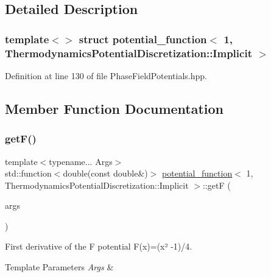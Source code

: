 \subsection{Detailed Description}
\subsubsection*{template$<$$>$\newline
struct potential\+\_\+function$<$ 1, Thermodynamics\+Potential\+Discretization\+::\+Implicit $>$}



Definition at line 130 of file Phase\+Field\+Potentials.\+hpp.



\subsection{Member Function Documentation}
\mbox{\label{structpotential__function_3_011_00_01ThermodynamicsPotentialDiscretization_1_1Implicit_01_4_af57f36f2f98b7c524a03273504fa82a7}} 
\subsubsection{\texorpdfstring{get\+F()}{getF()}}
{\footnotesize\ttfamily template$<$typename... Args$>$ \\
std\+::function$<$double(const double\&)$>$ \hyperlink{structpotential__function}{potential\+\_\+function}$<$ 1, Thermodynamics\+Potential\+Discretization\+::\+Implicit $>$\+::getF (\begin{DoxyParamCaption}\item[{Args...}]{args }\end{DoxyParamCaption})\hspace{0.3cm}{\ttfamily [inline]}}



First derivative of the F potential F(x)=(x² -\/1)/4. 


\begin{DoxyTemplParams}{Template Parameters}
{\em Args} & \\
\hline
\end{DoxyTemplParams}

